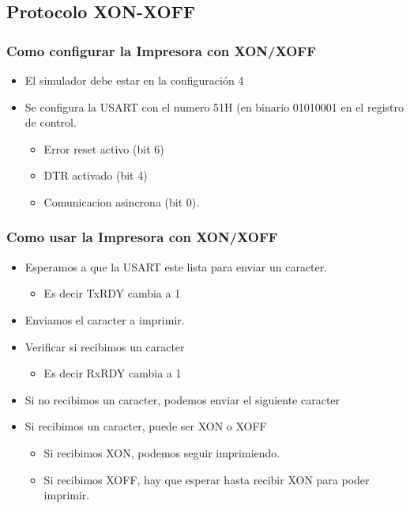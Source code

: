 \documentclass{beamer}
\begin{document}
\subsection{Protocolo XON-XOFF}

\begin{frame}[fragile]
\frametitle{Como configurar la Impresora con XON/XOFF}
\begin{itemize}
 \item El simulador debe estar en la configuración 4
 \item Se configura la USART con el numero 51H (en binario 01010001 en el registro de control.
 \begin{itemize}
 \item Error reset activo (bit 6)
 \item DTR activado (bit 4)
 \item Comunicacion asincrona (bit 0). 
\end{itemize}

 \end{itemize}
\end{frame}

\begin{frame}[fragile]
\frametitle{Como usar la Impresora con XON/XOFF}

\begin{itemize}
\item Esperamos a que la USART este lista para enviar un caracter. 
\begin{itemize}
\item Es decir TxRDY cambia a 1 
\end{itemize}
\item Enviamos el caracter a imprimir. 
\item Verificar si recibimos un caracter
\begin{itemize}
 \item Es decir RxRDY cambia a 1
\end{itemize}
\item Si no recibimos un caracter, podemos enviar el siguiente caracter
\item Si recibimos un caracter, puede ser XON o XOFF
\begin{itemize}
\item Si recibimos XON, podemos seguir imprimiendo.
\item Si recibimos XOFF, hay que esperar hasta recibir XON para poder imprimir.
\end{itemize}
\end{itemize}

\end{frame}
\end{document}
